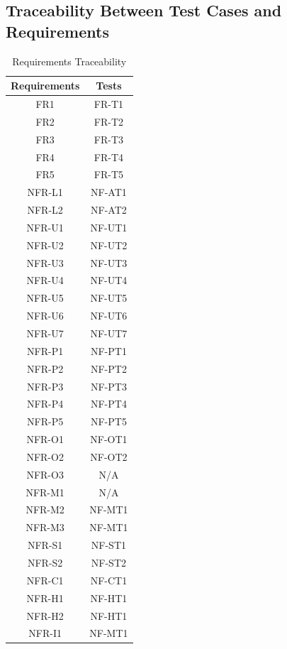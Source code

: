 \documentclass[12pt, titlepage]{article}
\begin{document}
\subsection{Traceability Between Test Cases and Requirements}

\begin{table}[H]
	\centering
	\caption{Requirements Traceability}
	\label{my-label}
	\begin{tabular}{|c|c|}
		\hline
		\textbf{Requirements} & \textbf{Tests} \\ \hline
		FR1 & FR-T1 \\ \hline
		FR2 & FR-T2 \\ \hline
		FR3 & FR-T3 \\ \hline
		FR4 & FR-T4 \\ \hline
		FR5 & FR-T5 \\ \hline
		NFR-L1 & NF-AT1 \\ \hline
    NFR-L2 & NF-AT2 \\ \hline
    NFR-U1 & NF-UT1 \\ \hline
    NFR-U2 & NF-UT2 \\ \hline
    NFR-U3 & NF-UT3 \\ \hline
    NFR-U4 & NF-UT4 \\ \hline
    NFR-U5 & NF-UT5\\ \hline
    NFR-U6 & NF-UT6 \\ \hline
    NFR-U7 & NF-UT7 \\ \hline
    NFR-P1 & NF-PT1 \\ \hline
    NFR-P2 & NF-PT2 \\ \hline
    NFR-P3 & NF-PT3 \\ \hline
    NFR-P4 & NF-PT4 \\ \hline
    NFR-P5 & NF-PT5 \\ \hline
    NFR-O1 & NF-OT1 \\ \hline
    NFR-O2 & NF-OT2 \\ \hline
    NFR-O3 & N/A \\ \hline
    NFR-M1 & N/A \\ \hline
    NFR-M2 & NF-MT1 \\ \hline
    NFR-M3 & NF-MT1 \\ \hline
    NFR-S1 & NF-ST1 \\ \hline
    NFR-S2 & NF-ST2 \\ \hline
    NFR-C1 & NF-CT1 \\ \hline
    NFR-H1 & NF-HT1 \\ \hline
    NFR-H2 & NF-HT1 \\ \hline
    NFR-I1 & NF-MT1 \\ \hline
	\end{tabular}
\end{table}
\end{document}
